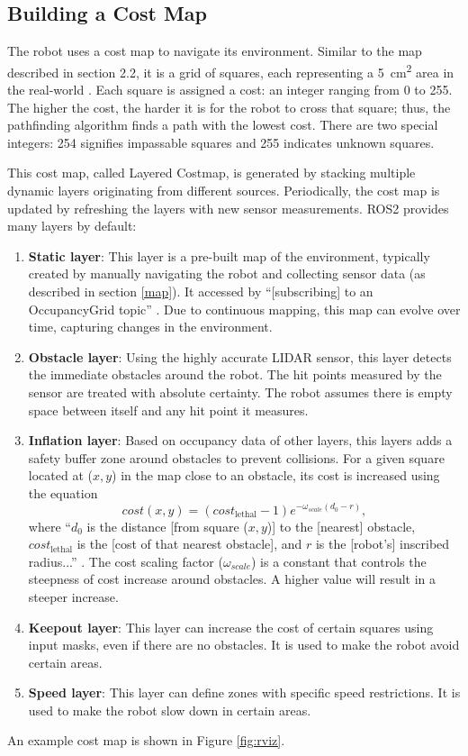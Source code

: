 \subsection{Building a Cost Map} \label{cost-map}
The robot uses a cost map to navigate its environment. Similar to the map described in section 2.2, it is a grid of squares, each representing a \qty{5}{cm^2} area in the real-world \parencite{macenskiDesksROSMaintainers2023}. Each square is assigned a cost: an integer ranging from 0 to 255. The higher the cost, the harder it is for the robot to cross that square; thus, the pathfinding algorithm finds a path with the lowest cost. There are two special integers: 254 signifies impassable squares and 255 indicates unknown squares.

This cost map, called Layered Costmap, is generated by stacking multiple dynamic layers originating from different sources. Periodically, the cost map is updated by refreshing the layers with new sensor measurements. ROS2 provides many layers by default:
\begin{enumerate}
    \item \textbf{Static layer}: This layer is a pre-built map of the environment, typically created by manually navigating the robot and collecting sensor data (as described in section \ref{map}). It accessed by ``[subscribing] to an OccupancyGrid topic'' \parencite{macenskiDesksROSMaintainers2023}. Due to continuous mapping, this map can evolve over time, capturing changes in the environment.
    \item \textbf{Obstacle layer}: Using the highly accurate LIDAR sensor, this layer detects the immediate obstacles around the robot. The hit points measured by the sensor are treated with absolute certainty. The robot assumes there is empty space between itself and any hit point it measures.
    \item \textbf{Inflation layer}: Based on occupancy data of other layers, this layers adds a safety buffer zone around obstacles to prevent collisions. For a given square located at ($x,y$) in the map close to an obstacle, its cost is increased using the equation
          \[
              cost(x,y)=(cost_\text{lethal}-1)e^{-\omega_{scale}(d_0-r)},
          \]
          where ``$d_0$ is the distance [from square ($x,y$)] to the [nearest] obstacle, $cost_\text{lethal}$ is the [cost of that nearest obstacle], and $r$ is the [robot's] inscribed radius...'' \parencite{macenskiDesksROSMaintainers2023}. The cost scaling factor ($\omega_{scale}$) is a constant that controls the steepness of cost increase around obstacles. A higher value will result in a steeper increase.
    \item \textbf{Keepout layer}: This layer can increase the cost of certain squares using input masks, even if there are no obstacles. It is used to make the robot avoid certain areas.
    \item \textbf{Speed layer}: This layer can define zones with specific speed restrictions. It is used to make the robot slow down in certain areas.
\end{enumerate}
An example cost map is shown in Figure \ref{fig:rviz}.

